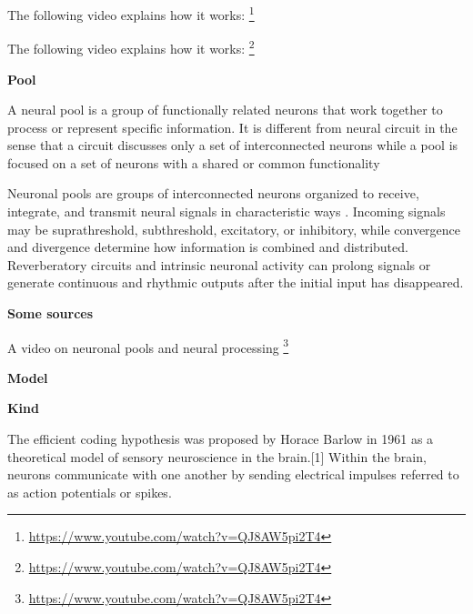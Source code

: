 \documentclass{book}
\providecommand{\ProjectDeepHeading}[2]{%
    \par\medskip\noindent\textbf{#2}\par\smallskip
}
\providecommand{\seeherefooter}[1]{\footnote{\url{#1}}}
\begin{document}

The following video explains how it works:
    \seeherefooter{https://www.youtube.com/watch?v=QJ8AW5pi2T4}


The following video explains how it works:
    \seeherefooter{https://www.youtube.com/watch?v=QJ8AW5pi2T4}

\ProjectDeepHeading{6}{Pool}


A neural pool is a group of functionally related neurons that work together to process or represent specific information. It is different from neural circuit in the sense that a circuit discusses only a set of interconnected neurons while a pool is focused on a set of neurons with a shared or common functionality


   Neuronal pools are groups of interconnected neurons organized to receive, integrate, and transmit neural signals in characteristic ways \cite{brainkart-2017-transmission-and-processing-of-signals-in-neuronal-pools}. Incoming signals may be suprathreshold, subthreshold, excitatory, or inhibitory, while convergence and divergence determine how information is combined and distributed.
   Reverberatory circuits and intrinsic neuronal activity can prolong signals or generate continuous and rhythmic outputs after the initial input has disappeared.

   \ProjectDeepHeading{9}{Some sources}

      A video on neuronal pools and neural processing
      \seeherefooter{https://www.youtube.com/watch?v=QJ8AW5pi2T4}

\ProjectDeepHeading{5}{Model}

\ProjectDeepHeading{6}{Kind}


The efficient coding hypothesis was proposed by Horace Barlow in 1961 as a theoretical model of sensory neuroscience in the brain.[1] Within the brain, neurons communicate with one another by sending electrical impulses referred to as action potentials or spikes.
    
\end{document}
